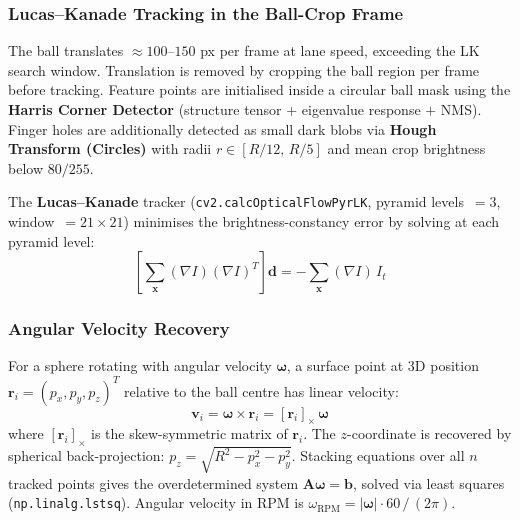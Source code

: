 \documentclass[11pt,twoside]{article}
\begin{document}
\subsubsection*{Lucas--Kanade Tracking in the Ball-Crop Frame}
The ball translates $\approx 100$--$150$ px per frame at lane speed, exceeding the LK search window.
Translation is removed by cropping the ball region per frame before tracking.
Feature points are initialised inside a circular ball mask using the \textbf{Harris Corner Detector} (structure tensor $+$ eigenvalue response $+$ NMS).
Finger holes are additionally detected as small dark blobs via \textbf{Hough Transform (Circles)} with radii $r \in [R/12,\, R/5]$ and mean crop brightness below $80/255$.

The \textbf{Lucas--Kanade} tracker (\texttt{cv2.calcOpticalFlowPyrLK}, pyramid levels~$= 3$, window~$= 21 \times 21$) minimises the brightness-constancy error by solving at each pyramid level:
\begin{equation}
    \left[\sum_{\mathbf{x}} (\nabla I)(\nabla I)^T\right] \mathbf{d} = -\sum_{\mathbf{x}} (\nabla I)\,I_t
\end{equation}

\subsubsection*{Angular Velocity Recovery}
For a sphere rotating with angular velocity $\bm{\omega}$, a surface point at 3D position $\mathbf{r}_i = (p_x, p_y, p_z)^T$ relative to the ball centre has linear velocity:
\begin{equation}
    \mathbf{v}_i = \bm{\omega} \times \mathbf{r}_i = [\mathbf{r}_i]_\times\,\bm{\omega}
\end{equation}
where $[\mathbf{r}_i]_\times$ is the skew-symmetric matrix of $\mathbf{r}_i$.
The $z$-coordinate is recovered by spherical back-projection: $p_z = \sqrt{R^2 - p_x^2 - p_y^2}$.
Stacking equations over all $n$ tracked points gives the overdetermined system $\mathbf{A}\bm{\omega} = \mathbf{b}$, solved via least squares (\texttt{np.linalg.lstsq}).
Angular velocity in RPM is $\omega_{\text{RPM}} = |\bm{\omega}| \cdot 60\,/\,(2\pi)$.

{}
\label{sec:implementation}
\end{document}
